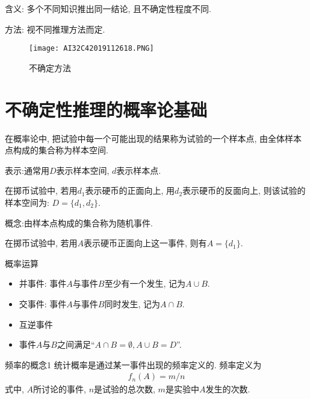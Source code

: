     含义: 多个不同知识推出同一结论, 且不确定性程度不同.

    方法: 视不同推理方法而定.
\begin{figure}[H]
\centering
\texttt{[image: AI32C42019112618.PNG]}
\caption{不确定方法}
\label{AI32fig2618}
\end{figure}
\section{不确定性推理的概率论基础}
在概率论中, 把试验中每一个可能出现的结果称为试验的一个样本点, 由全体样本点构成的集合称为样本空间.

表示:通常用$D$表示样本空间, $d$表示样本点.

\begin{example}
  在掷币试验中, 若用$d_1$表示硬币的正面向上, 用$d_2$表示硬币的反面向上, 则该试验的样本空间为: $D=\{d_1, d_2\}$.
\end{example}

概念:由样本点构成的集合称为随机事件.

\begin{example}
  在掷币试验中, 若用$A$表示硬币正面向上这一事件, 则有$A=\{d_1\}$.
\end{example}

概率运算
\begin{itemize}
\item 并事件: 事件$A$与事件$B$至少有一个发生, 记为$A\cup B$.

\item 交事件: 事件$A$与事件$B$同时发生, 记为$A\cap B$.

\item 互逆事件
\item 事件$A$与$B$之间满足“$A\cap B=\emptyset,  A\cup B=D$”.
\end{itemize}

\begin{mydef}{频率的概念}{1}
统计概率是通过某一事件出现的频率定义的. 频率定义为
\begin{align}
  f_n(A)=m/n
\end{align}
式中, $A$所讨论的事件, $n$是试验的总次数, $m$是实验中$A$发生的次数.
\end{mydef}

